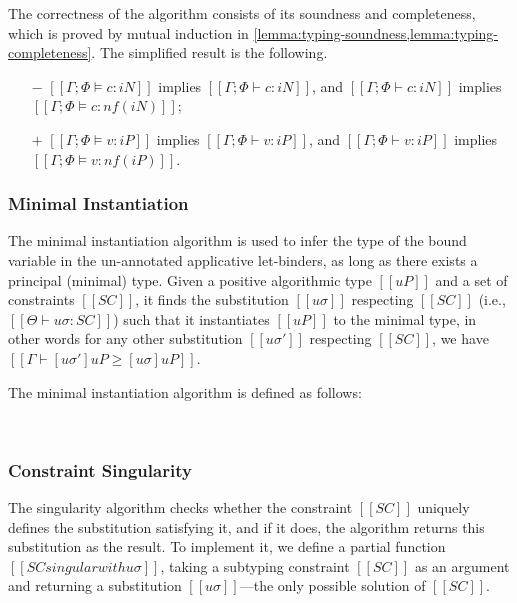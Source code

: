 The correctness of the algorithm consists of its soundness and 
completeness, which is proved by mutual
induction in \cref{lemma:typing-soundness,lemma:typing-completeness}.
The simplified result is the following.
\begin{theorempreview}
  \hfill
  \begin{itemize}
    \item [$-$] $[[Γ; Φ ⊨ c : iN]]$ implies $[[Γ; Φ ⊢ c : iN]]$, 
      and $[[Γ; Φ ⊢ c : iN]]$ implies $[[Γ; Φ ⊨ c : nf(iN)]]$;
    \item [$+$] $[[Γ; Φ ⊨ v : iP]]$ implies $[[Γ; Φ ⊢ v : iP]]$, 
      and $[[Γ; Φ ⊢ v : iP]]$ implies $[[Γ; Φ ⊨ v : nf(iP)]]$.
  \end{itemize}
\end{theorempreview}

\subsubsection{Minimal Instantiation}
The minimal instantiation algorithm is used
to infer the type of the bound variable in the un-annotated 
applicative let-binders, as long as there exists a principal
(minimal) type.  
Given a positive algorithmic type $[[uP]]$ 
and a set of constraints $[[SC]]$, it finds the substitution $[[uσ]]$
respecting $[[SC]]$ (i.e., $[[Θ ⊢ uσ : SC]]$) such that
it instantiates $[[uP]]$ to the minimal type, in other words 
for any other substitution $[[uσ']]$ respecting $[[SC]]$,
we have $[[Γ ⊢ [uσ']uP ≥ [uσ]uP]]$.

The minimal instantiation algorithm is defined as follows:
\begin{algorithm}
  \hfill \\
  \ottdefnSINGminInstLabeled[\apppref]{}
\end{algorithm}

\subsubsection{Constraint Singularity}
\label{sec:a:constraint-singularity}

The singularity algorithm checks whether the constraint $[[SC]]$
uniquely defines the substitution satisfying it, and if it does,
the algorithm returns this substitution as the result.
To implement it, we define a partial function $[[SC singular with uσ]]$,
taking a subtyping constraint $[[SC]]$ as an argument and returning a substitution 
$[[uσ]]$---the only possible solution of $[[SC]]$. 

